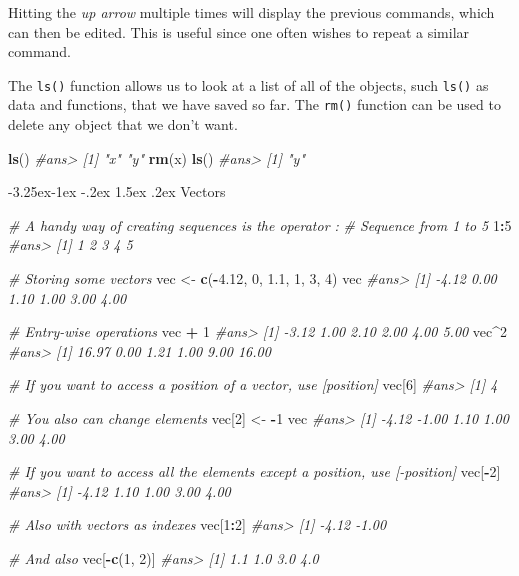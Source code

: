 \documentclass[]{book}
\makeatletter
\newenvironment{Shaded}{\begin{snugshade}}{\end{snugshade}}
\newcommand{\KeywordTok}[1]{\textcolor[rgb]{0.13,0.29,0.53}{\textbf{#1}}}
\newcommand{\DecValTok}[1]{\textcolor[rgb]{0.00,0.00,0.81}{#1}}
\newcommand{\FloatTok}[1]{\textcolor[rgb]{0.00,0.00,0.81}{#1}}
\newcommand{\StringTok}[1]{\textcolor[rgb]{0.31,0.60,0.02}{#1}}
\newcommand{\CommentTok}[1]{\textcolor[rgb]{0.56,0.35,0.01}{\textit{#1}}}
\newcommand{\OperatorTok}[1]{\textcolor[rgb]{0.81,0.36,0.00}{\textbf{#1}}}
\newcommand{\NormalTok}[1]{#1}
\renewcommand\subsection{\@startsection{subsection}{2}{\z@}%
                                     {-3.25ex\@plus -1ex \@minus -.2ex}%
                                     {1.5ex \@plus .2ex}%
                                     {\normalfont\large\bfseries\color{Violet}}}
\theoremstyle{definition}
\theoremstyle{definition}
\theoremstyle{definition}
\theoremstyle{remark}
\makeatother
\begin{document}
Hitting the \emph{up arrow} multiple times will display the previous
commands, which can then be edited. This is useful since one often
wishes to repeat a similar command.

The \texttt{ls()} function allows us to look at a list of all of the
objects, such \texttt{ls()} as data and functions, that we have saved so
far. The \texttt{rm()} function can be used to delete any object that we
don't want.

\begin{Shaded}
\begin{Highlighting}[]
\KeywordTok{ls}\NormalTok{()}
\CommentTok{#ans> [1] "x" "y"}
\KeywordTok{rm}\NormalTok{(x)}
\KeywordTok{ls}\NormalTok{()}
\CommentTok{#ans> [1] "y"}
\end{Highlighting}
\end{Shaded}

\subsection{Vectors}\label{vectors}

\begin{Shaded}
\begin{Highlighting}[]

\CommentTok{# A handy way of creating sequences is the operator :}
\CommentTok{# Sequence from 1 to 5}
\DecValTok{1}\OperatorTok{:}\DecValTok{5}
\CommentTok{#ans> [1] 1 2 3 4 5}

\CommentTok{# Storing some vectors}
\NormalTok{vec <-}\StringTok{ }\KeywordTok{c}\NormalTok{(}\OperatorTok{-}\FloatTok{4.12}\NormalTok{, }\DecValTok{0}\NormalTok{, }\FloatTok{1.1}\NormalTok{, }\DecValTok{1}\NormalTok{, }\DecValTok{3}\NormalTok{, }\DecValTok{4}\NormalTok{)}
\NormalTok{vec}
\CommentTok{#ans> [1] -4.12  0.00  1.10  1.00  3.00  4.00}

\CommentTok{# Entry-wise operations}
\NormalTok{vec }\OperatorTok{+}\StringTok{ }\DecValTok{1}
\CommentTok{#ans> [1] -3.12  1.00  2.10  2.00  4.00  5.00}
\NormalTok{vec}\OperatorTok{^}\DecValTok{2}
\CommentTok{#ans> [1] 16.97  0.00  1.21  1.00  9.00 16.00}

\CommentTok{# If you want to access a position of a vector, use [position]}
\NormalTok{vec[}\DecValTok{6}\NormalTok{]}
\CommentTok{#ans> [1] 4}

\CommentTok{# You also can change elements}
\NormalTok{vec[}\DecValTok{2}\NormalTok{] <-}\StringTok{ }\OperatorTok{-}\DecValTok{1}
\NormalTok{vec}
\CommentTok{#ans> [1] -4.12 -1.00  1.10  1.00  3.00  4.00}

\CommentTok{# If you want to access all the elements except a position, use [-position]}
\NormalTok{vec[}\OperatorTok{-}\DecValTok{2}\NormalTok{]}
\CommentTok{#ans> [1] -4.12  1.10  1.00  3.00  4.00}

\CommentTok{# Also with vectors as indexes}
\NormalTok{vec[}\DecValTok{1}\OperatorTok{:}\DecValTok{2}\NormalTok{]}
\CommentTok{#ans> [1] -4.12 -1.00}

\CommentTok{# And also}
\NormalTok{vec[}\OperatorTok{-}\KeywordTok{c}\NormalTok{(}\DecValTok{1}\NormalTok{, }\DecValTok{2}\NormalTok{)]}
\CommentTok{#ans> [1] 1.1 1.0 3.0 4.0}
\end{Highlighting}
\end{Shaded}
\end{document}
